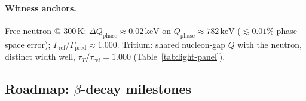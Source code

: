 \documentclass[11pt,notitlepage]{amsart}
\begin{document}
\paragraph{Witness anchors.}
Free neutron @ $300\,\mathrm{K}$: $\Delta Q_{\mathrm{phase}}\approx 0.02\,\mathrm{keV}$ on
$Q_{\mathrm{phase}}\approx 782\,\mathrm{keV}$ ($\lesssim 0.01\%$ phase-space error);
$\Gamma_{\mathrm{ref}}/\Gamma_{\mathrm{pred}}\approx 1.000$.
Tritium: shared nucleon-gap $Q$ with the neutron, distinct width well,
$\tau_T/\tau_{\mathrm{ref}}=1.000$ (Table~\ref{tab:light-panel}).

\subsection{Roadmap: $\beta$-decay milestones}
\label{sec:beta-roadmap}
\end{document}
